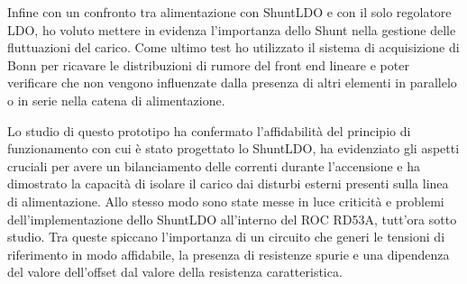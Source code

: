 Infine con un confronto tra alimentazione con ShuntLDO e con il solo regolatore LDO, ho voluto mettere in evidenza l'importanza dello Shunt nella gestione delle fluttuazioni del carico. 
Come ultimo test ho utilizzato il sistema di acquisizione di Bonn per ricavare le distribuzioni di rumore del front end lineare e poter verificare che non vengono influenzate dalla presenza di altri elementi in parallelo o in serie nella catena di alimentazione. 

Lo studio di questo prototipo ha confermato l'affidabilità del principio di funzionamento con cui è stato progettato lo ShuntLDO, ha evidenziato gli aspetti cruciali per avere un bilanciamento delle correnti durante l'accensione e ha dimostrato la capacità di isolare il carico dai disturbi esterni presenti sulla linea di alimentazione.
Allo stesso modo sono state messe in luce criticità e problemi dell'implementazione dello ShuntLDO all'interno del ROC RD53A, tutt'ora sotto studio. Tra queste spiccano l'importanza di un circuito che generi le tensioni di riferimento in modo affidabile, la presenza di resistenze spurie e una dipendenza del valore dell'offset dal valore della resistenza caratteristica. 





